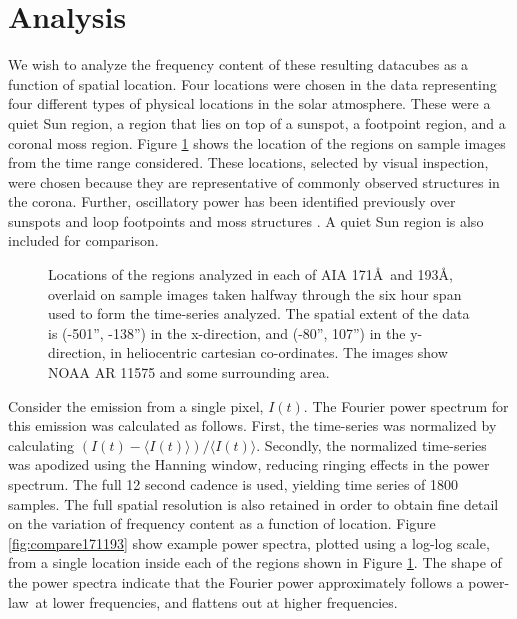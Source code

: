 \documentclass[onecolumn]{emulateapj}
\newcommand{\PS}{power spectrum}
\newcommand{\PL}{power-law}
\newcommand{\BF}{ }
\begin{document}
\section{Analysis}\label{sec:anal}
We wish to analyze the frequency content of these resulting datacubes
as a function of spatial location.  Four locations were chosen in the
data representing four different types of physical locations in the
solar atmosphere.  These were a quiet Sun region, a region that lies
on top of a sunspot, a footpoint region, and a coronal moss region.
Figure \ref{fig:loc171193} shows the location of the regions on sample
images from the time range considered. {\BF These locations, selected
  by visual inspection, were chosen because they are representative of
  commonly observed structures in the corona.  Further,
  oscillatory power has been identified previously over sunspots and
  loop footpoints \citep{2002A&A...387L..13D} and moss structures
  \citep{2003ApJ...595L..63D}.  A quiet Sun region is also included
  for comparison.}
\begin{figure}
\centerline{
}
\caption{Locations of the regions analyzed in each of AIA 171\AA\ and
  193\AA, overlaid on sample images taken halfway through the six hour
  span used to form the time-series analyzed.  The spatial extent of
  the data is (-501'', -138'') in the x-direction, and (-80'', 107'')
  in the y-direction, in heliocentric cartesian co-ordinates.  The
  images show NOAA AR 11575 and some surrounding area.}
\label{fig:loc171193}
\end{figure}

Consider the emission from a single pixel, $I(t)$.  The Fourier power
spectrum for this emission was calculated as follows.  First, the
time-series was normalized by calculating $(I(t) - \langle I(t)
\rangle)/\langle I(t) \rangle$. Secondly, the normalized time-series
was apodized using the Hanning window, reducing ringing effects in the
\PS.  The full 12 second cadence is used, yielding time series of 1800
samples.  The full spatial resolution is also retained in order to
obtain fine detail on the variation of frequency content as a function
of location.  Figure \ref{fig:compare171193} show example power
spectra, plotted using a log-log scale, from a single location inside
each of the regions shown in Figure \ref{fig:loc171193}.  The shape of
the power spectra indicate that the Fourier power approximately
follows a \PL\ at lower frequencies, and flattens out at higher
frequencies.
\end{document}
